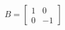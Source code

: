 \documentclass[preview]{standalone}
\begin{document}
\begin{align*}
B = \begin{bmatrix} 1 & 0 \\ 0 & -1 \end{bmatrix}
\end{align*}
\end{document}

